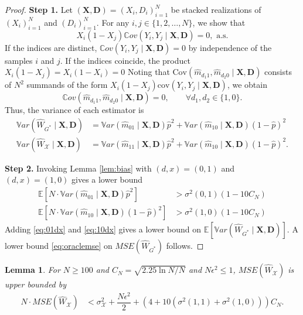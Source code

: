 \documentclass[12pt]{article}
\numberwithin{equation}{section}
\theoremstyle{plain}                         %
\newtheorem{lemma}{Lemma}
\theoremstyle{definition}                  %
\theoremstyle{remark}                      %
\newcommand{\E}{\mathbb{E}}
\newcommand{\Var}{\mathbb{V}ar}
\newcommand{\Cov}{\mathbb{C}ov}
\begin{document}
\begin{proof}[Proof]

\textbf{Step 1.} Let $(\mathbf{X}, \mathbf{D})= (X_i, D_i)_{i=1}^N$ be stacked realizations of $(X_i)_{i=1}^N$ and $(D_i)_{i=1}^N$.  For any $i,j \in \{1,2,\dots, N\}$, we show that
$$
X_i (1-X_j)\Cov(Y_i, Y_j \mid \mathbf{X}, \mathbf{D})=0, \text{ a.s.}
$$  
If the indices are distinct,  $\Cov(Y_i, Y_j \mid \mathbf{X}, \mathbf{D})  =0$ by independence of the samples $i$ and $j$. If the indices coincide, the product $X_i(1-X_j) = X_i (1-X_i) =0$  Noting that 
$ \text{Cov} (\widehat m_{d_1 1}, \widehat m_{d_2 0} \mid \mathbf{X}, \mathbf{D})$ consists of $N^2$ summands of the form $X_i (1-X_j)\text{cov} (Y_i, Y_j \mid \mathbf{X}, \mathbf{D})$, we obtain 
   $$
  \Cov (\widehat m_{d_1 1}, \widehat m_{d_2 0} \mid \mathbf{X}, \mathbf{D})  = 0, \qquad \forall d_1, d_2 \in \{1, 0\}.
 $$
Thus,  the variance of each estimator is 
 \begin{align}
  \Var  (\widehat{W}_{G^{*}} \mid \mathbf{X}, \mathbf{D})  &= \Var ( \widehat m_{01} \mid \mathbf{X}, \mathbf{D})   \widehat{p}^2 + \Var ( \widehat m_{10} \mid \mathbf{X}, \mathbf{D})   (1-\widehat{p})^2 \label{eq:varghat} \\
  \Var  (\widehat{W}_{\mathcal{X}} \mid \mathbf{X}, \mathbf{D})  &= \Var ( \widehat m_{11} \mid \mathbf{X}, \mathbf{D})   \widehat{p}^2 + \Var ( \widehat m_{10} \mid \mathbf{X}, \mathbf{D})   (1-\widehat{p})^2. \label{eq:varghat2} 
\end{align}


\noindent \textbf{Step 2.}  Invoking Lemma \ref{lem:bias} with $(d,x)=(0,1)$ and $(d,x)=(1,0)$ gives a lower bound
\begin{align}
 \E [N \cdot\Var ( \widehat m_{01} \mid \mathbf{X}, \mathbf{D})   \widehat{p}^2]&> \sigma^2(0,1) (1-10 C_N)  \label{eq:01dx} \\
 \E [ N \cdot \Var ( \widehat m_{10} \mid \mathbf{X}, \mathbf{D})  (1- \widehat{p})^2]&>  \sigma^2(1,0)(1 - 10 C_N) \label{eq:10dx}
\end{align}
Adding  \eqref{eq:01dx} and \eqref{eq:10dx} gives a lower bound on $\E [ \Var  (\widehat{W}_{G^{*}} \mid \mathbf{X}, \mathbf{D})]$. A lower bound \eqref{eq:oraclemse} on $ MSE (\widehat W_{G^{*}})$ follows.
\end{proof}


 \begin{lemma}
  \label{lem:m0mse}
 For $N \geq 100$ and $C_N = \sqrt{2.25 \ln N/N}$ and $N \epsilon^2 \leq 1$,  $ MSE (\widehat{W}_{\mathcal{X}})$ is upper bounded by 
 \begin{align}
 N \cdot MSE (\widehat{W}_{\mathcal{X}}) &<\sigma^2_{\mathcal{X}}+\dfrac{N\epsilon^2}{2}+ (4+10(\sigma^2(1,1)+\sigma^2(1,0)))C_N.\label{eq:m0mse}
 \end{align}
  \end{lemma}
\end{document}
